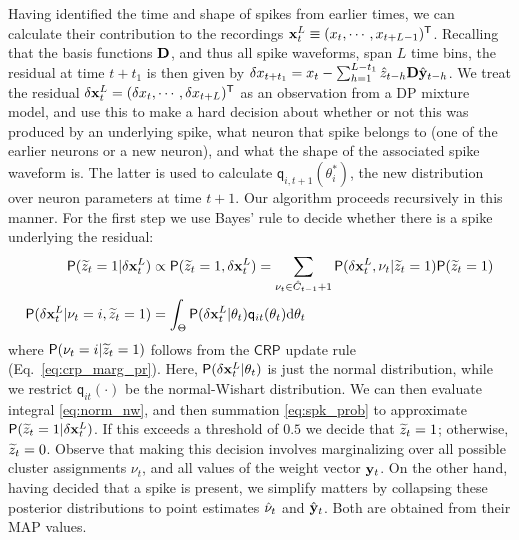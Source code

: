 Having identified the time and shape of spikes from earlier times, we can calculate their contribution to the recordings 
$\mathbf{x}^L_t \equiv (x_{t},\cdots, x_{t+L-1})^{\mathsf{T}}$.
Recalling that the basis functions $\mathbf{D}$, and thus all spike waveforms, span $L$ time bins, the residual at time $t+t_1$ is then given by
 $ \delta x_{t+t_1} = x_t - \sum_{h=1}^{L-t_1} \hat{z}_{t-h} \mathbf{D}\hat{\mathbf{y}}_{t-h}$. %
% 
We treat the residual $\delta{\mathbf{x}}^L_{t} =  (\delta x_{t}, \cdots, \delta x_{t+L})^{\mathsf{T}}$ as an observation from a DP mixture model, and use this to make a hard decision about whether or not this was produced 
by an underlying spike, what neuron that spike belongs 
to (one of the earlier neurons or a new neuron), and what the shape of the associated spike waveform is. The latter is used to calculate
$\mathsf{q}_{i,t+1}(\theta^*_i)$, the new distribution over neuron parameters at time $t+1$. Our algorithm proceeds recursively in this manner. 
% 
% 
For the first step we use Bayes' rule to decide whether there is a spike underlying the residual:\vspace{-5pt}
\begin{align}
  \mathsf{P}(\widetilde{z}_t = 1 | \delta{\mathbf{x}}^L_t)  &\propto \mathsf{P}(\widetilde{z}_t = 1,  \delta{\mathbf{x}}^L_t) = \sum_{\nu_t \in \hat{C}_{t-1}+1} \mathsf{P}(\delta{\mathbf{x}}^L_t, {\nu_t} | \widetilde{z}_t = 1) \mathsf{P}(\widetilde{z}_t = 1) \label{eq:spk_prob}\\
  \mathsf{P}(\delta{\mathbf{x}}^L_t | {\nu_t = i} , \widetilde{z}_t = 1) &= \int_{\Theta} \mathsf{P}(\delta{\mathbf{x}}^L_t | \theta_t) \mathsf{q}_{it} (\theta_t) \mathrm{d} \theta_t  \label{eq:norm_nw}
\end{align}
where $\mathsf{P}({\nu_t} = i | \widetilde{z}_t = 1)$ follows from the $\mathsf{CRP}$ update rule (Eq.\ \eqref{eq:crp_marg_pr}).
Here,  $\mathsf{P}(\delta{\mathbf{x}}^L_t | \theta_t)$ is just the normal distribution, while we restrict $\mathsf{q}_{it}(\cdot)$ be the 
normal-Wishart distribution. %
We can then evaluate integral \eqref{eq:norm_nw}, and then summation \eqref{eq:spk_prob} to approximate $\mathsf{P}(\widetilde{z}_t = 1 | \delta{\mathbf{x}}^L_t)$. 
If this exceeds a threshold of $0.5$ we decide that $\widetilde{z}_t=1$; otherwise,  $\widetilde{z}_t = 0$.
Observe that making this decision involves marginalizing over all possible cluster assignments $\nu_t$, and all values of the weight vector $\mathbf{y}_t$.
On the other hand, having decided that a spike is present, we simplify matters by collapsing these posterior distributions to point estimates 
$\hat{\nu}_t$ and $\hat{\mathbf{y}}_t$. Both are obtained from their MAP values. 

